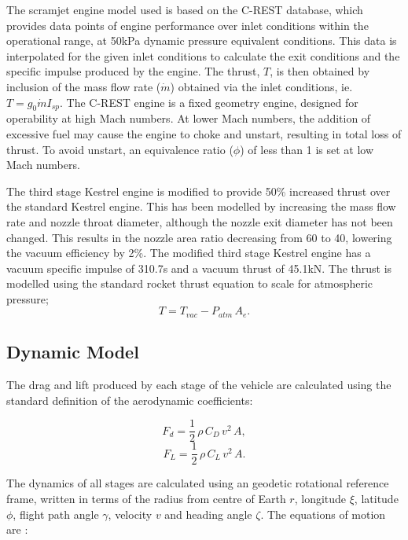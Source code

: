 \documentclass[]{aiaa-tc}
\begin{document}
The scramjet engine model used is based on the C-REST database\cite{Preller2017}, which provides data points of engine performance over inlet conditions within the operational range, at 50kPa dynamic pressure equivalent conditions. This data is interpolated for the given inlet conditions to calculate the exit conditions and the specific impulse produced by the engine. The thrust, $T$, is then obtained by inclusion of the mass flow rate ($\dot{m}$) obtained via the inlet conditions, ie. $T = g_0\dot{m}I_{sp}$.
The C-REST engine is a fixed geometry engine, designed for operability at high Mach numbers\cite{Preller2017}. At lower Mach numbers, the addition of excessive fuel may cause the engine to choke and unstart, resulting in total loss of thrust\cite{Preller2017}. To avoid unstart, an equivalence ratio ($\phi$) of less than 1 is set at low Mach numbers. 

 The third stage Kestrel engine is modified to provide 50\% increased thrust over the standard Kestrel engine. This has been modelled by increasing the mass flow rate and nozzle throat diameter, although the nozzle exit diameter has not been changed. This results in the nozzle area ratio decreasing from 60\cite{Vehicle2008} to 40, lowering the vacuum efficiency by 2\%\cite{RPE}. The modified third stage Kestrel engine has a vacuum specific impulse of 310.7s\cite{Vehicle2008} and a vacuum thrust of 45.1kN. The thrust is modelled using the standard rocket thrust equation to scale for atmospheric pressure; 
\begin{equation}
T = T_{vac} -P_{atm} \, A_e.
\end{equation}

\subsection{Dynamic Model} \label{section:dynamics}
The drag and lift produced by each stage of the vehicle are calculated using the standard definition of the aerodynamic coefficients:

\begin{equation}
F_d = \frac{1}{2} \, \rho \, C_D \, v^2 \, A ,
\end{equation}
\begin{equation}
F_L = \frac{1}{2} \, \rho \, C_L \, v^2 \, A .
\end{equation}

The dynamics of all stages are calculated using an geodetic rotational reference frame, written in terms of the radius from centre of Earth $r$, longitude $\xi$, latitude $\phi$, flight path angle $\gamma$, velocity $v$ and heading angle $\zeta$. The equations of motion are \cite{Josselyn2002a}:
\end{document}
